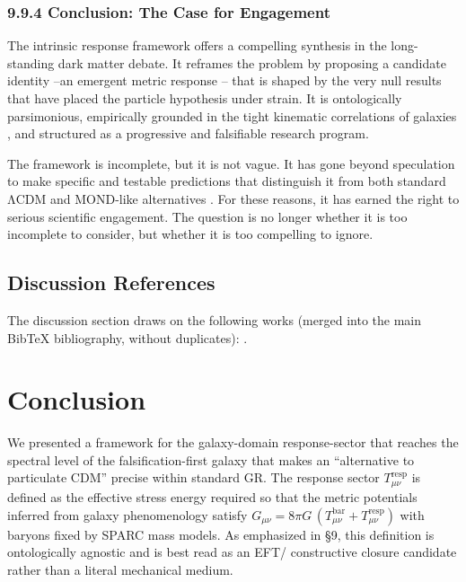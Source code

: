 \documentclass[11pt]{article}
\begin{document}
\subsubsection{9.9.4 Conclusion: The Case for Engagement}\label{conclusion-the-case-for-engagement}

The intrinsic response framework offers a compelling synthesis in the long-standing dark matter debate. It reframes the problem by proposing a candidate identity --an emergent metric response -- that is shaped by the very null results that have placed the particle hypothesis under strain. It is ontologically parsimonious, empirically grounded in the tight kinematic correlations of galaxies \citep{McGaugh2016RAR}, and structured as a progressive and falsifiable research program.

The framework is incomplete, but it is not vague. It has gone beyond speculation to make specific and testable predictions that distinguish it from both standard ΛCDM and MOND-like alternatives \citep{Bullock2017,Verlinde2017}. For these reasons, it has earned the right to serious scientific engagement. The question is no longer whether it is too incomplete to consider, but whether it is too compelling to ignore.

\subsection{Discussion References}\label{discussion-references}

The discussion section draws on the following works (merged into the main BibTeX bibliography, without duplicates):
\citep{Planck2020,Kuhn1962,Undagoitia2016,LUX2023,Milgrom1983,Bekenstein2004,Clowe2006,Lakatos1978,Lelli2016SPARC,Bardeen1980,McGaugh2016RAR,Bullock2017,Verlinde2017}.


\section{Conclusion}\label{conclusion}

We presented a framework for the galaxy-domain response-sector that reaches the spectral level of the falsification-first galaxy that makes an ``alternative to particulate CDM'' precise within standard GR. The response sector \(T_{\mu\nu}^{\text{resp}}\) is defined as the effective stress energy required so that the metric potentials inferred from galaxy phenomenology satisfy \(G_{\mu\nu} = 8\pi G\,\left( T_{\mu\nu}^{\text{bar}} + T_{\mu\nu}^{\text{resp}} \right)\) with baryons fixed by SPARC mass models. As emphasized in §9, this definition is ontologically agnostic and is best read as an EFT/ constructive closure candidate rather than a literal mechanical medium.
\end{document}
